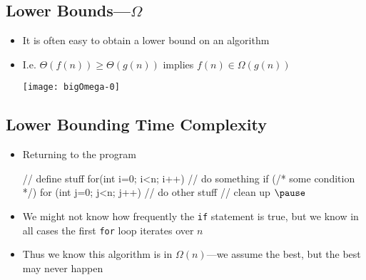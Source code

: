
\begin{slide}
\section{Lower Bounds---$\Omega$}

\begin{PauseHighLight}
  \begin{itemize}
  \item It is often easy to obtain a lower bound on an algorithm\pause
  \item I.e. $\Theta(f(n)) \geq \Theta(g(n))$ implies $f(n) \in
    \Omega(g(n))$
    \begin{center}
      \texttt{[image: bigOmega-0]}\pause
    \end{center}
  \end{itemize}
\end{PauseHighLight}

\end{slide}


\begin{slide}
\section[-1]{Lower Bounding Time Complexity}

\begin{PauseHighLight}
  \begin{itemize}
  \item Returning to the program
\begin{java}
// define stuff
for(int i=0; i<n; i++)  {
  // do something
  if (/* some condition */) {
    for (int j=0; j<n; j++) {
      // do other stuff
    }
  }
}
// clean up $\pause$
\end{java}\vspace{-0.5cm}
\item We might not know how frequently the \texttt{if} statement is
  true, but we know in all cases the first \texttt{for} loop iterates
  over $n$\pause
\item Thus we know this algorithm is in $\Omega(n)$\pause---we assume
  the best, but the best may never happen\pauseb
  \end{itemize}
\end{PauseHighLight}

\end{slide}

